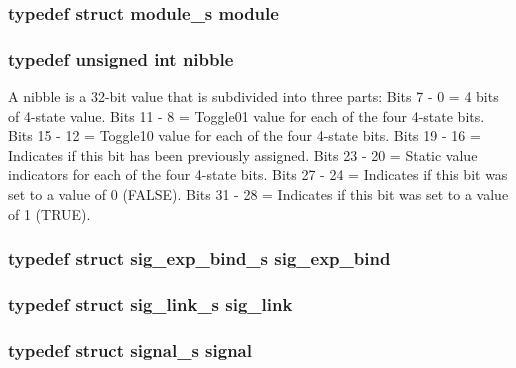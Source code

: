\subsubsection{\setlength{\rightskip}{0pt plus 5cm}typedef struct {\bf module\_\-s} module}\label{defines_8h_a129}


\subsubsection{\setlength{\rightskip}{0pt plus 5cm}typedef unsigned int nibble}\label{defines_8h_a118}


A nibble is a 32-bit value that is subdivided into three parts: Bits 7 - 0 = 4 bits of 4-state value. Bits 11 - 8 = Toggle01 value for each of the four 4-state bits. Bits 15 - 12 = Toggle10 value for each of the four 4-state bits. Bits 19 - 16 = Indicates if this bit has been previously assigned. Bits 23 - 20 = Static value indicators for each of the four 4-state bits. Bits 27 - 24 = Indicates if this bit was set to a value of 0 (FALSE). Bits 31 - 28 = Indicates if this bit was set to a value of 1 (TRUE). 
\subsubsection{\setlength{\rightskip}{0pt plus 5cm}typedef struct {\bf sig\_\-exp\_\-bind\_\-s} sig\_\-exp\_\-bind}\label{defines_8h_a133}


\subsubsection{\setlength{\rightskip}{0pt plus 5cm}typedef struct {\bf sig\_\-link\_\-s} sig\_\-link}\label{defines_8h_a128}


\subsubsection{\setlength{\rightskip}{0pt plus 5cm}typedef struct {\bf signal\_\-s} signal}\label{defines_8h_a123}


